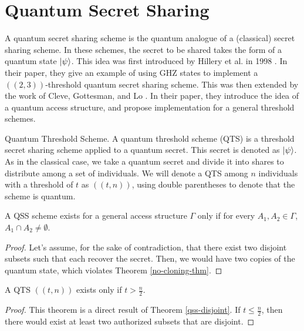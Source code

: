 \section{Quantum Secret Sharing}

A quantum secret sharing scheme is the quantum analogue of a (classical) secret sharing scheme. In these schemes, the secret to be shared takes the form of a quantum state $\ket{\psi}$. This idea was first introduced by Hillery et al. in 1998 \cite{Hillery_1999}. In their paper, they give an example of using GHZ states to implement a $((2,3))$-threshold quantum secret sharing scheme. This was then extended by the work of Cleve, Gottesman, and Lo \cite{Cleve_1999}. In their paper, they introduce the idea of a quantum access structure, and propose implementation for a general threshold schemes.

\theoremstyle{definition}
\begin{definition}{Quantum Threshold Scheme.}
    A quantum threshold scheme (QTS) is a threshold secret sharing scheme applied to a quantum secret. This secret is denoted as $\ket{\psi}$. As in the classical case, we take a quantum secret and divide it into shares to distribute among a set of individuals. We will denote a QTS among $n$ individuals with a threshold of $t$ as $((t,n))$, using double parentheses to denote that the scheme is quantum.
\end{definition}

\begin{theorem}
    \label{qss-disjoint}
    A QSS scheme exists for a general access structure $\Gamma$ only if for every $A_1, A_2 \in \Gamma$, $A_1 \cap A_2 \neq \emptyset$.
\end{theorem}

\begin{proof}
    Let's assume, for the sake of contradiction, that there exist two disjoint subsets such that each recover the secret. Then, we would have two copies of the quantum state, which violates Theorem \ref{no-cloning-thm}. 
\end{proof}

\begin{theorem}
    \label{qts}
    A QTS $((t,n))$ exists only if $t > \frac{n}{2}$.
\end{theorem}

\begin{proof}
    This theorem is a direct result of Theorem \ref{qss-disjoint}. If $t \leq \frac{n}{2}$, then there would exist at least two authorized subsets that are disjoint. 
\end{proof}

